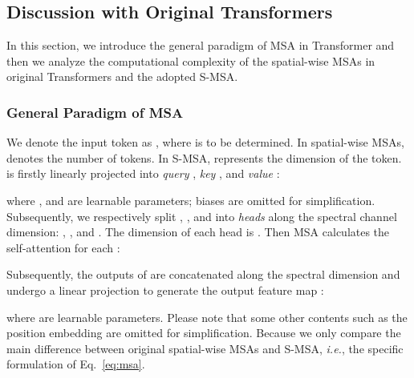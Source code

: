 \documentclass[10pt,twocolumn,letterpaper]{article}
\begin{document}
\subsection{Discussion with Original Transformers}
\label{sec:discuss}
In this section, we  introduce the general paradigm of MSA in Transformer and then we analyze the computational complexity of the spatial-wise MSAs in original Transformers and the adopted S-MSA.

\subsubsection{General Paradigm of MSA}
We denote the input token as , where  is to be determined. In spatial-wise MSAs,  denotes the number of tokens. In S-MSA,  represents the dimension of the token.  is firstly linearly projected into \emph{query} , \emph{key} , and \emph{value} :

where , and  are learnable parameters; biases are omitted for simplification. Subsequently, we respectively split , , and  into  \emph{heads} along the spectral channel dimension: , , and . The dimension of each head is . Then MSA calculates the self-attention for each :

Subsequently, the outputs of   are concatenated along the spectral dimension and undergo a linear projection to generate the output feature map : 

where  are learnable parameters. Please note that some other contents such as the position embedding are omitted for simplification. Because we only compare the main difference between original spatial-wise MSAs and S-MSA, \emph{i.e.}, the specific formulation of Eq.~\eqref{eq:msa}. 

\begin{table}[t]
	\begin{center}
		
		\setlength{\tabcolsep}{2.5pt}
\caption{\small Comparisons of the properties of  different MSAs. }
		\label{tab:msa_compare}
	\end{center}\vspace{-5mm}
\end{table}
\end{document}
